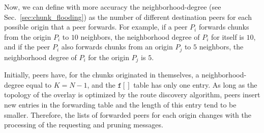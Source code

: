 Now, we can define with more accuracy the \gls{neighborhood-degree}
(see Sec.~\ref{sec:chunk_flooding}) as the number of different
destination peers for each possible origin that a peer forwards. For
example, if a peer $P_i$ forwards chunks from the origin $P_i$ to $10$
neighbors, the neighborhood degree of $P_i$ for itself is $10$, and if
the peer $P_i$ also forwards chunks from an origin $P_j$ to $5$
neighbors, the neighborhood degree of $P_i$ for the origin $P_j$ is
$5$.

Initially, peers have, for the chunks originated in themselves, a
\gls{neighborhood-degree} equal to $K=N-1$, and the
$\mathtt{f}[]$ table has only one entry. As long as the topology
of the overlay is optimized by the route discovery algorithm, peers
insert new entries in the forwarding table and the length of this
entry tend to be smaller. Therefore, the lists of forwarded peers for
each origin changes with the processing of the requesting and pruning
messages.
